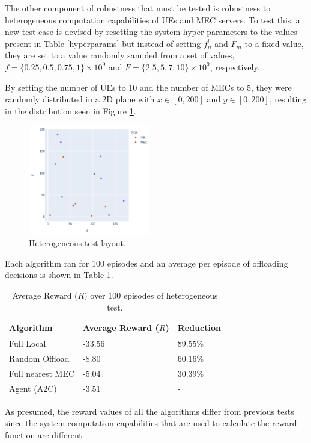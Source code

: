 The other component of robustness that must be tested is robustness to heterogeneous computation capabilities of \acrshort{UE}s and \acrshort{MEC} servers. To test this, a new test case is devised by resetting the system hyper-parameters to the values present in Table \ref{hyperparams} but instead of setting $f^l_n$ and $F_m$ to a fixed value, they are set to a value randomly sampled from a set of values, $f = \{0.25, 0.5, 0.75, 1\} \times 10^9$ and $F = \{2.5, 5, 7, 10\} \times 10^9$, respectively.

By setting the number of \acrshort{UE}s to 10 and the number of \acrshort{MEC}s to 5, they were randomly distributed in a 2D plane with $x \in [0, 200]$ and $y \in [0, 200]$, resulting in the distribution seen in Figure \ref{hetero_test}.

\begin{figure}[H]
  \centering
  \includegraphics[width=200px]{images/5_10_layout.png}
  \caption{Heterogeneous test layout.}  \label{hetero_test}
\end{figure}

Each algorithm ran for 100 episodes and an average per episode of offloading decisions is shown in Table \ref{hetero_table}.

\begin{table}[H]
\centering
\begin{tabular}{|l|l|l|}
\hline
Algorithm        & Average Reward ($R$) & Reduction\\ \hline
Full Local       & -33.56 & 89.55\%\\
Random Offload   & -8.80 & 60.16\%\\
Full nearest MEC & -5.04 & 30.39\%\\ 
Agent (A2C) & -3.51 & -\\ \hline
\end{tabular}
\caption{Average Reward ($R$) over 100 episodes of heterogeneous test.} \label{hetero_table}
\end{table}

As presumed, the reward values of all the algorithms differ from previous tests since the system computation capabilities that are used to calculate the reward function are different.

